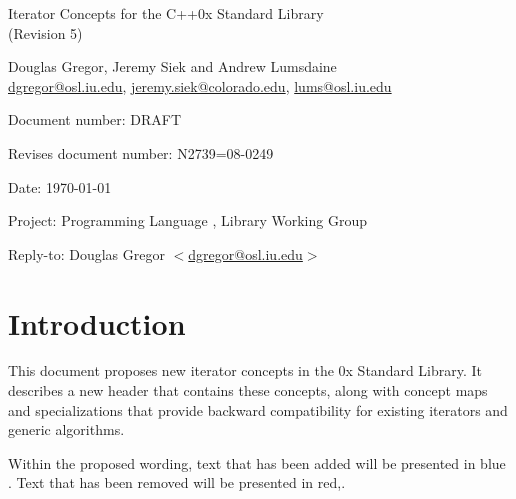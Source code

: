 \documentclass[american,twoside]{book}
\begin{document}
\raggedbottom

\begin{titlepage}
\begin{center}
\huge
Iterator Concepts for the C++0x Standard Library\\
(Revision 5)
\vspace{0.5in}

\normalsize
Douglas Gregor, Jeremy Siek and Andrew Lumsdaine \\
\href{mailto:dgregor@osl.iu.edu}{dgregor@osl.iu.edu}, \href{mailto:jeremy.siek@colorado.edu}{jeremy.siek@colorado.edu}, \href{mailto:lums@osl.iu.edu}{lums@osl.iu.edu}
\end{center}

\vspace{1in}
\par\noindent Document number: DRAFT \vspace{-6pt}
\par\noindent Revises document number: N2739=08-0249 \vspace{-6pt}
\par\noindent Date: \today\vspace{-6pt}
\par\noindent Project: Programming Language \Cpp{}, Library Working Group\vspace{-6pt}
\par\noindent Reply-to: Douglas Gregor $<$\href{mailto:dgregor@osl.iu.edu}{dgregor@osl.iu.edu}$>$\vspace{-6pt}

\section*{Introduction}
This document proposes new iterator concepts in the \Cpp0x Standard
Library. It describes a new header  that
contains these concepts, along with concept maps and
 specializations that provide backward
compatibility for existing iterators and generic algorithms.

Within the proposed wording, text that has been added
\textcolor{addclr}{will be presented in blue} . Text that has been removed will be
presented \textcolor{remclr}{in red},. 



\end{titlepage}
\end{document}
